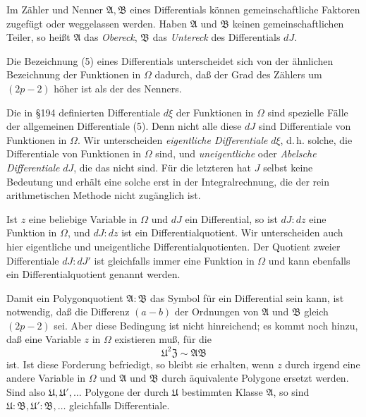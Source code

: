 \documentclass[12pt,a4paper]{article}
\begin{document}
Im Zähler und Nenner $\mathfrak{A}, \mathfrak{B}$ eines Differentials können gemeinschaftliche Faktoren zugefügt oder weggelassen werden. Haben $\mathfrak{A}$ und $\mathfrak{B}$ keinen gemeinschaftlichen Teiler, so heißt $\mathfrak{A}$ das \emph{Obereck}, $\mathfrak{B}$ das \emph{Untereck} des Differentials $dJ$.

Die Bezeichnung (5) eines Differentials unterscheidet sich von der ähnlichen Bezeichnung der Funktionen in $\Omega$ dadurch, daß der Grad des Zählers um $(2p-2)$ höher ist als der des Nenners.

Die in \S 194 definierten Differentiale $d\xi$ der Funktionen in $\Omega$ sind spezielle Fälle der allgemeinen Differentiale (5). Denn nicht alle diese $dJ$ sind Differentiale von Funktionen in $\Omega$. Wir unterscheiden \emph{eigentliche Differentiale} $d\xi$, d.\,h. solche, die Differentiale von Funktionen in $\Omega$ sind, und \emph{uneigentliche} oder \emph{Abelsche Differentiale} $dJ$, die das nicht sind. Für die letzteren hat $J$ selbst keine Bedeutung und erhält eine solche erst in der Integralrechnung, die der rein arithmetischen Methode nicht zugänglich ist.

Ist $z$ eine beliebige Variable in $\Omega$ und $dJ$ ein Differential, so ist $dJ:dz$ eine Funktion in $\Omega$, und $dJ:dz$ ist ein Differentialquotient. Wir unterscheiden auch hier eigentliche und uneigentliche Differentialquotienten. Der Quotient zweier Differentiale $dJ:dJ'$ ist gleichfalls immer eine Funktion in $\Omega$ und kann ebenfalls ein Differentialquotient genannt werden.

Damit ein Polygonquotient $\mathfrak{A}:\mathfrak{B}$ das Symbol für ein Differential sein kann, ist notwendig, daß die Differenz $(a-b)$ der Ordnungen von $\mathfrak{A}$ und $\mathfrak{B}$ gleich $(2p-2)$ sei. Aber diese Bedingung ist nicht hinreichend; es kommt noch hinzu, daß eine Variable $z$ in $\Omega$ existieren muß, für die
\begin{equation}\label{eq:197-6}
\mathfrak{U}^2 \mathfrak{Z} \sim \mathfrak{A}\mathfrak{B}
\end{equation}
ist. Ist diese Forderung befriedigt, so bleibt sie erhalten, wenn $z$ durch irgend eine andere Variable in $\Omega$ und $\mathfrak{A}$ und $\mathfrak{B}$ durch äquivalente Polygone ersetzt werden. Sind also $\mathfrak{U}, \mathfrak{U}', \ldots$ Polygone der durch $\mathfrak{U}$ bestimmten Klasse $\mathfrak{A}$, so sind $\mathfrak{U}:\mathfrak{B}, \mathfrak{U}':\mathfrak{B}, \ldots$ gleichfalls Differentiale.
\end{document}

